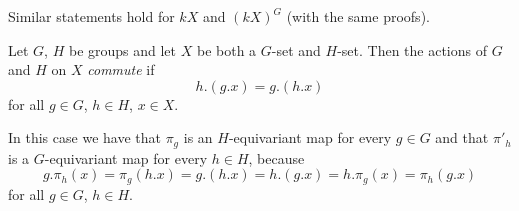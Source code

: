 \begin{remark}
  Similar statements hold for $kX$ and $(kX)^G$ (with the same proofs).
\end{remark}


\begin{definition}
  Let $G$, $H$ be groups and let $X$ be both a $G$-set and $H$-set.
  Then the actions of $G$ and $H$ on $X$ \emph{commute} if
  \[
      h.(g.x)
    = g.(h.x)
  \]
  for all $g \in G$, $h \in H$, $x \in X$.
\end{definition}


\begin{remark}
  In this case we have that $\pi_g$ is an $H$-equivariant map for every $g \in G$ and that $\pi'_h$ is a $G$-equivariant map for every $h \in H$, because
  \[
      g.\pi_h(x)
    = \pi_g(h.x)
    = g.(h.x)
    = h.(g.x)
    = h.\pi_g(x)
    = \pi_h(g.x)
  \]
  for all $g \in G$, $h \in H$.
\end{remark}


